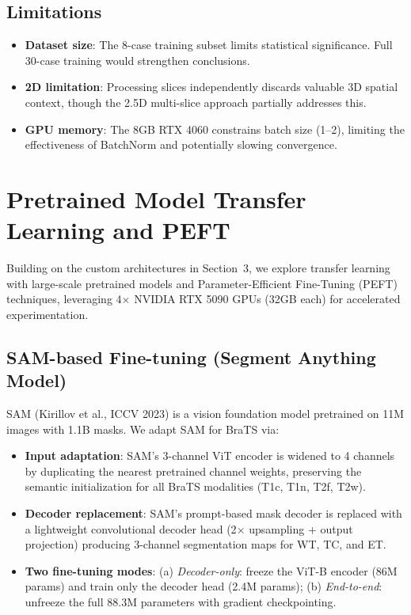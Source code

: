 \documentclass[11pt,a4paper]{article}
\begin{document}
\subsection{Limitations}
\begin{itemize}
  \item \textbf{Dataset size}: The 8-case training subset limits statistical significance. Full 30-case training would strengthen conclusions.
  \item \textbf{2D limitation}: Processing slices independently discards valuable 3D spatial context, though the 2.5D multi-slice approach partially addresses this.
  \item \textbf{GPU memory}: The 8GB RTX 4060 constrains batch size (1--2), limiting the effectiveness of BatchNorm and potentially slowing convergence.
\end{itemize}

\section{Pretrained Model Transfer Learning and PEFT}
\label{sec:pretrained}

Building on the custom architectures in Section~3, we explore transfer learning with large-scale pretrained models and Parameter-Efficient Fine-Tuning (PEFT) techniques, leveraging 4$\times$ NVIDIA RTX 5090 GPUs (32GB each) for accelerated experimentation.

\subsection{SAM-based Fine-tuning (Segment Anything Model)}

SAM (Kirillov et al., ICCV 2023) is a vision foundation model pretrained on 11M images with 1.1B masks. We adapt SAM for BraTS via:

\begin{itemize}
  \item \textbf{Input adaptation}: SAM's 3-channel ViT encoder is widened to 4 channels by duplicating the nearest pretrained channel weights, preserving the semantic initialization for all BraTS modalities (T1c, T1n, T2f, T2w).
  \item \textbf{Decoder replacement}: SAM's prompt-based mask decoder is replaced with a lightweight convolutional decoder head (2$\times$ upsampling + output projection) producing 3-channel segmentation maps for WT, TC, and ET.
  \item \textbf{Two fine-tuning modes}: (a) \textit{Decoder-only}: freeze the ViT-B encoder (86M params) and train only the decoder head (2.4M params); (b) \textit{End-to-end}: unfreeze the full 88.3M parameters with gradient checkpointing.
\end{itemize}
\end{document}
